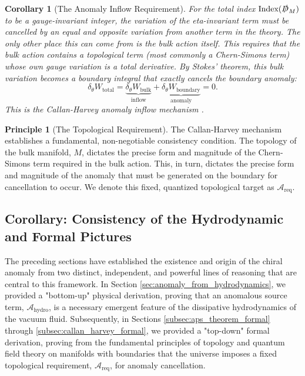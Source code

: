 \documentclass[11pt, letterpaper]{report}
\theoremstyle{plain} %
\newtheorem{corollary}[theorem]{Corollary}
\theoremstyle{definition} %
\newtheorem{principle}{Principle}[chapter]
\theoremstyle{remark} %
\newcommand{\BulkM}{M}
\newcommand{\DiracOpBulk}{\slashed{D}_{\BulkM}}
\newcommand{\Index}{\text{Index}}
\begin{document}
\begin{corollary}[The Anomaly Inflow Requirement]
\label{cor:anomaly_inflow_requirement_full_detail}
For the total index $\Index(\DiracOpBulk)$ to be a gauge-invariant integer, the variation of the eta-invariant term must be cancelled by an equal and opposite variation from another term in the theory. The only other place this can come from is the bulk action itself. This requires that the bulk action contains a topological term (most commonly a Chern-Simons term) whose own gauge variation is a total derivative. By Stokes' theorem, this bulk variation becomes a boundary integral that exactly cancels the boundary anomaly:
\begin{equation}
    \delta_\theta W_{\text{total}} = \underbrace{\delta_\theta W_{\text{bulk}}}_{\text{inflow}} + \underbrace{\delta_\theta W_{\text{boundary}}}_{\text{anomaly}} = 0.
\end{equation}
This is the Callan-Harvey anomaly inflow mechanism \cite{CallanHarvey1985}.
\end{corollary}

\begin{principle}[The Topological Requirement]
The Callan-Harvey mechanism establishes a fundamental, non-negotiable consistency condition. The topology of the bulk manifold, $\BulkM$, dictates the precise form and magnitude of the Chern-Simons term required in the bulk action. This, in turn, dictates the precise form and magnitude of the anomaly that must be generated on the boundary for cancellation to occur. We denote this fixed, quantized topological target as $\mathcal{A}_{\text{req}}$.
\end{principle}


\subsection{Corollary: Consistency of the Hydrodynamic and Formal Pictures}
\label{subsec:consistency_hydro_formal}

The preceding sections have established the existence and origin of the chiral anomaly from two distinct, independent, and powerful lines of reasoning that are central to this framework. In Section \ref{sec:anomaly_from_hydrodynamics}, we provided a "bottom-up" physical derivation, proving that an anomalous source term, $\mathcal{A}_{\text{hydro}}$, is a necessary emergent feature of the dissipative hydrodynamics of the vacuum fluid. Subsequently, in Sections \ref{subsec:aps_theorem_formal} through \ref{subsec:callan_harvey_formal}, we provided a "top-down" formal derivation, proving from the fundamental principles of topology and quantum field theory on manifolds with boundaries that the universe imposes a fixed topological requirement, $\mathcal{A}_{\text{req}}$, for anomaly cancellation.
\end{document}
